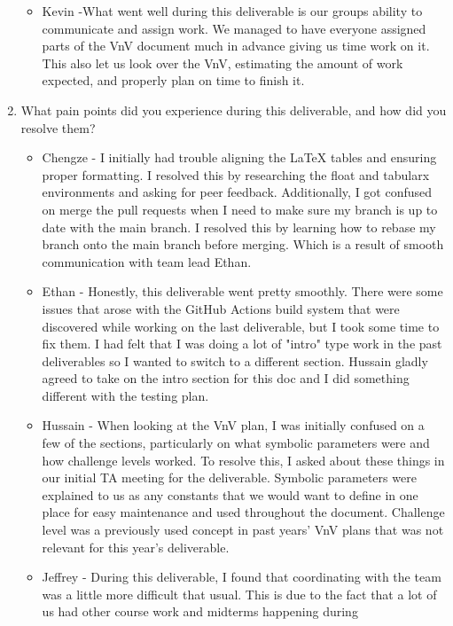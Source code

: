\documentclass[12pt, titlepage]{article}
\begin{document}
\begin{enumerate}
\begin{itemize}
    \item Kevin -What went well during this deliverable is our groups ability to communicate and assign 
    work. We managed to have everyone assigned parts of the VnV document much in advance giving us time 
    work on it. This also let us look over the VnV, estimating the amount of work expected, and properly 
    plan on time to finish it.
  \end{itemize}
  \item What pain points did you experience during this deliverable, and how
    did you resolve them?
  \begin{itemize}
    \item Chengze - I initially had trouble aligning the LaTeX tables and ensuring proper formatting. I resolved 
    this by researching the float and tabularx environments and asking for peer feedback. Additionally, I got confused 
    on merge the pull requests when I need to make sure my branch is up to date with the main branch. I resolved this by
    learning how to rebase my branch onto the main branch before merging. Which is a result of smooth communication with 
    team lead Ethan.
    \item Ethan - Honestly, this deliverable went pretty smoothly. There were
      some issues that arose with the GitHub Actions build system that were
      discovered while working on the last deliverable, but I took some time to
      fix them. I had felt that I was doing a lot of "intro" type work in the
      past deliverables so I wanted to switch to a different section. Hussain
      gladly agreed to take on the intro section for this doc and I did
      something different with the testing plan.
    \item Hussain - When looking at the VnV plan, I was initially confused
    on a few of the sections, particularly on what symbolic parameters were
    and how challenge levels worked. To resolve this, I asked about these
    things in our initial TA meeting for the deliverable. Symbolic parameters
    were explained to us as any constants that we would want to define in one
    place for easy maintenance and used throughout the document. Challenge
    level was a previously used concept in past years' VnV plans that was
    not relevant for this year's deliverable.
    \item Jeffrey - During this deliverable, I found that coordinating with
      the team was a little more difficult that usual. This is due to the fact
      that a lot of us had other course work and midterms happening during

\end{itemize}
\end{enumerate}
\end{document}
